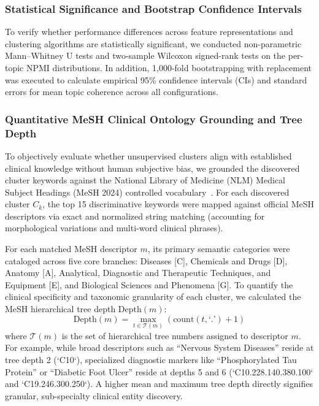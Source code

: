 \documentclass[a4paper,fleqn]{cas-dc}
\begin{document}
\subsubsection{Statistical Significance and Bootstrap Confidence Intervals}

To verify whether performance differences across feature representations and clustering algorithms are statistically significant, we conducted non-parametric Mann--Whitney U tests and two-sample Wilcoxon signed-rank tests on the per-topic NPMI distributions. In addition, 1,000-fold bootstrapping with replacement was executed to calculate empirical 95\% confidence intervals (CIs) and standard errors for mean topic coherence across all configurations.

\subsubsection{Quantitative MeSH Clinical Ontology Grounding and Tree Depth}

To objectively evaluate whether unsupervised clusters align with established clinical knowledge without human subjective bias, we grounded the discovered cluster keywords against the National Library of Medicine (NLM) Medical Subject Headings (MeSH 2024) controlled vocabulary~\cite{ref36}. For each discovered cluster $C_k$, the top 15 discriminative keywords were mapped against official MeSH descriptors via exact and normalized string matching (accounting for morphological variations and multi-word clinical phrases).

For each matched MeSH descriptor $m$, its primary semantic categories were cataloged across five core branches: Diseases [C], Chemicals and Drugs [D], Anatomy [A], Analytical, Diagnostic and Therapeutic Techniques, and Equipment [E], and Biological Sciences and Phenomena [G]. To quantify the clinical specificity and taxonomic granularity of each cluster, we calculated the MeSH hierarchical tree depth $\text{Depth}(m)$:
\begin{equation}
\text{Depth}(m) = \max_{t \in \mathcal{T}(m)} (\text{count}(t, \text{`.{}'}) + 1)
\end{equation}
where $\mathcal{T}(m)$ is the set of hierarchical tree numbers assigned to descriptor $m$. For example, while broad descriptors such as ``Nervous System Diseases'' reside at tree depth 2 (`C10`), specialized diagnostic markers like ``Phosphorylated Tau Protein'' or ``Diabetic Foot Ulcer'' reside at depths 5 and 6 (`C10.228.140.380.100` and `C19.246.300.250`). A higher mean and maximum tree depth directly signifies granular, sub-specialty clinical entity discovery.
\end{document}
